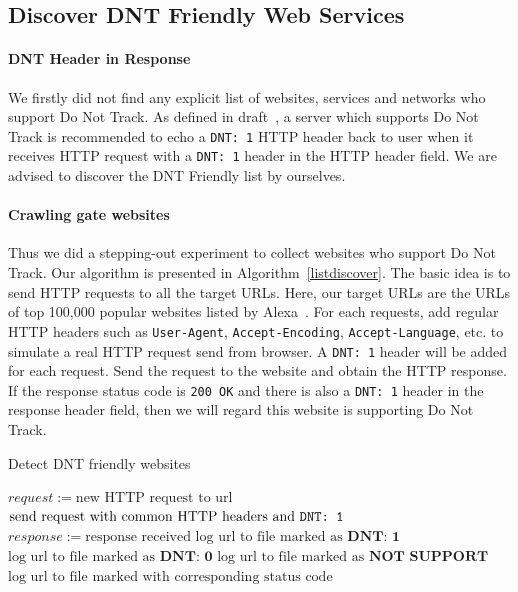 \documentclass{sig-alternate}
\begin{document}
\subsection{Discover DNT Friendly Web Services} \label{sec:dntheadertest}

\paragraph{DNT Header in Response}
We firstly did not find any explicit list of websites, services and networks who support Do Not Track. As defined in draft~\cite{dntdraft}, a server which supports Do Not Track is recommended to echo a \verb|DNT: 1| HTTP header back to user when it receives HTTP request with a \verb|DNT: 1| header in the HTTP header field. We are advised to discover the DNT Friendly list by ourselves.

\paragraph{Crawling gate websites}
Thus we did a stepping-out experiment to collect websites who support Do Not Track. Our algorithm is presented in Algorithm~\ref{listdiscover}. The basic idea is to send HTTP requests to all the target URLs. Here, our target URLs are the URLs of top 100,000 popular websites listed by Alexa~\cite{alexa}. For each requests, add regular HTTP headers such as \texttt{User-Agent}, \texttt{Accept-Encoding}, \texttt{Accept-Language}, etc. to simulate a real HTTP request send from browser. A \verb|DNT: 1| header will be added for each request. Send the request to the website and obtain the HTTP response. If the response status code is \verb|200 OK| and there is also a \verb|DNT: 1| header in the response header field, then we will regard this website is supporting Do Not Track.


\begin{algorithm}
\caption{Detect DNT friendly websites}\label{listdiscover}
\begin{algorithmic}
  \State $request := \text{new HTTP request to url}$
  \State $\text{send request with common HTTP headers and }\verb|DNT: 1|$ 
  \State $response := \text{response received}$
      \State $\text{log url to file marked as }\textbf{DNT: 1}$
      \State $\text{log url to file marked as }\textbf{DNT: 0}$
    \Else
      \State $\text{log url to file marked as }\textbf{NOT SUPPORT}$
    \EndIf
  \Else
    \State $\text{log url to file marked with corresponding status code}$
  \EndIf
\EndFor
\end{algorithmic}
\end{algorithm}
\end{document}
